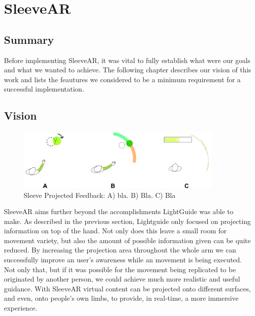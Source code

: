 \chapter{SleeveAR}
\label{sec:sleevear}

\section*{Summary}

Before implementing SleeveAR, it was vital to fully establish what were our goals and what we wanted to achieve. 
The following chapter describes our vision of this work and lists the feautures we considered to be a minimum requirement for a successful implementation.



\section{Vision}

\begin{figure}[!t]
    \begin{center}
        \includegraphics[width=0.9\textwidth]{imgs/interaction.png}
    \end{center}
    \caption{Sleeve Projected Feedback: A) bla. B) Bla. C) Bla}
    \label{fig:interaction}
\end{figure}

SleeveAR aims further beyond the accomplishments LightGuide was able to make. 
As described in the previous section, Lightguide only focused on projecting information on top of the hand. Not only does this leave a small room for movement variety, but also the amount of possible information given can be quite reduced.
By increasing the projection area throughout the whole arm we can successfully improve an user's awareness while an movement is being executed. 
Not only that, but if it was possible for the movement being replicated to be originated by another person, we could achieve much more realistic and useful guidance.
With SleeveAR virtual content can be projected onto different surfaces, and even, onto people's own limbs, to provide, in real-time, a more immersive experience. 

